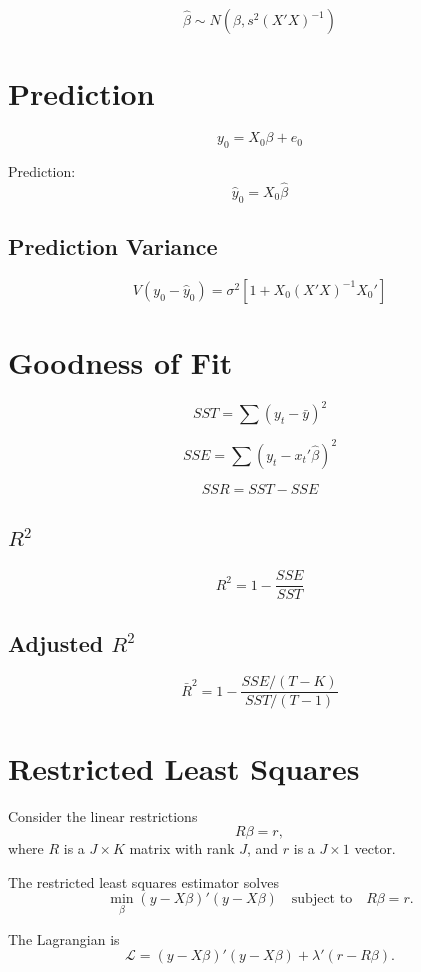\[
\hat{\beta} \sim N\left(\beta, s^2 (X'X)^{-1}\right)
\]

\section{Prediction}

\[
y_0 = X_0 \beta + e_0
\]

Prediction:
\[
\hat{y}_0 = X_0 \hat{\beta}
\]

\subsection{Prediction Variance}

\[
V(y_0 - \hat{y}_0) = \sigma^2 \left[1 + X_0 (X'X)^{-1} X_0'\right]
\]

\section{Goodness of Fit}

\[
SST = \sum (y_t - \bar{y})^2
\]

\[
SSE = \sum (y_t - x_t'\hat{\beta})^2
\]

\[
SSR = SST - SSE
\]

\subsection{$R^2$}

\[
R^2 = 1 - \frac{SSE}{SST}
\]

\subsection{Adjusted $R^2$}

\[
\bar{R}^2 = 1 - \frac{SSE/(T-K)}{SST/(T-1)}
\]



\section{Restricted Least Squares}

Consider the linear restrictions
\[
R\beta = r,
\]
where $R$ is a $J \times K$ matrix with rank $J$, and $r$ is a $J \times 1$ vector.

The restricted least squares estimator solves
\[
\min_{\beta} (y-X\beta)'(y-X\beta)
\quad \text{subject to} \quad R\beta = r.
\]

The Lagrangian is
\[
\mathcal{L}
=
(y-X\beta)'(y-X\beta)
+
\lambda'(r-R\beta).
\]

